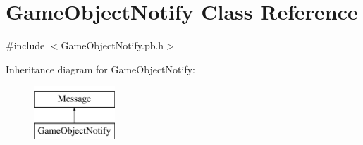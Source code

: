 \hypertarget{class_game_object_notify}{\section{Game\-Object\-Notify Class Reference}
\label{class_game_object_notify}
}


{\ttfamily \#include $<$Game\-Object\-Notify.\-pb.\-h$>$}

Inheritance diagram for Game\-Object\-Notify\-:\begin{figure}[H]
\begin{center}
\leavevmode
\includegraphics[height=2.000000cm]{class_game_object_notify}
\end{center}
\end{figure}
